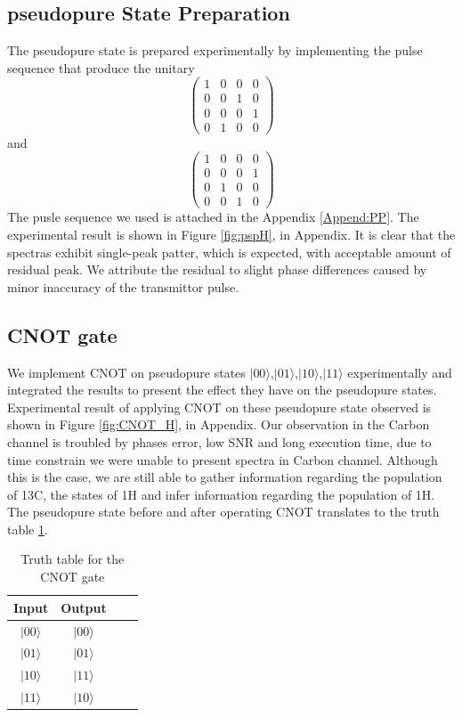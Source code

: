 \documentclass[%
 reprint,
 amsmath,amssymb,
 aps,
]{revtex4-2}
\begin{document}
\subsection{pseudopure State Preparation}
The pseudopure state is prepared experimentally by implementing the pulse sequence that produce the unitary
\[
    \begin{pmatrix}
    1 & 0 & 0 & 0\\
    0 & 0 & 1 & 0\\
    0 & 0 & 0 & 1\\
    0 & 1 & 0 & 0
    \end{pmatrix}
\]
and
\[
    \begin{pmatrix}
    1 & 0 & 0 & 0\\
    0 & 0 & 0 & 1\\
    0 & 1 & 0 & 0\\
    0 & 0 & 1 & 0
    \end{pmatrix}
\]
The pusle sequence we used is attached in the Appendix \ref{Append:PP}. The experimental result is shown in Figure \ref{fig:pspH}, in Appendix. It is clear that the spectras exhibit single-peak patter, which is expected, with acceptable amount of residual peak. We attribute the residual to slight phase differences caused by minor inaccuracy of the transmittor pulse.

\subsection{CNOT gate}
We implement CNOT on pseudopure states $|00\rangle$,$|01\rangle$,$|10\rangle$,$|11\rangle$ experimentally and integrated the results to present the effect they have on the pseudopure states. Experimental result of applying CNOT on these pseudopure state observed is shown in Figure \ref{fig:CNOT_H}, in Appendix. Our observation in the Carbon channel is troubled by phases error, low SNR and long execution time, due to time constrain we were unable to present spectra in Carbon channel. Although this is the case, we are still able to gather information regarding the population of 13C, the states of 1H and infer information regarding the population of 1H. The pseudopure state before and after operating CNOT translates to the truth table \ref{tab:CNOT}.

\begin{table}[ht]
    \centering
    \begin{tabular}{|c|c|c|c|}
        \hline
        \textbf{Input} & \textbf{Output} \\
        \hline
        $|00\rangle$ & $|00\rangle$ \\
        \hline
        $|01\rangle$ & $|01\rangle$ \\
        \hline
        $|10\rangle$ & $|11\rangle$ \\
        \hline
        $|11\rangle$ & $|10\rangle$ \\
        \hline
    \end{tabular}
    \caption{Truth table for the CNOT gate}
    \label{tab:CNOT}
\end{table}
\end{document}
